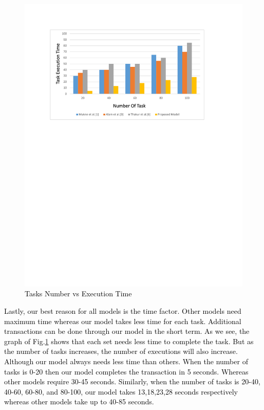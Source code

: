 \documentclass[12pt]{ucthesis}
\begin{document}
\begin{figure}[!t]
\includegraphics[width=15cm,scale=0.5]{img/Fig06380.pdf}
\caption{\textcolor{black}{Tasks Number vs Execution Time }} 
\label{fig6}
\end{figure}
\textcolor{black}{Lastly, our best reason for all models is the time factor. Other models need maximum time whereas our model takes less time for each task. Additional transactions can be done through our model in the short term. As we see, the graph of Fig.\ref{fig6} shows that each set needs less time to complete the task. But as the number of tasks increases, the number of executions will also increase. Although our model always needs less time than others. When the number of tasks is 0-20 then our model completes the transaction in 5 seconds. Whereas other models require 30-45 seconds. Similarly, when the number of tasks is 20-40, 40-60, 60-80, and 80-100, our model takes 13,18,23,28 seconds respectively whereas other models take up to 40-85 seconds.}
\end{document}
